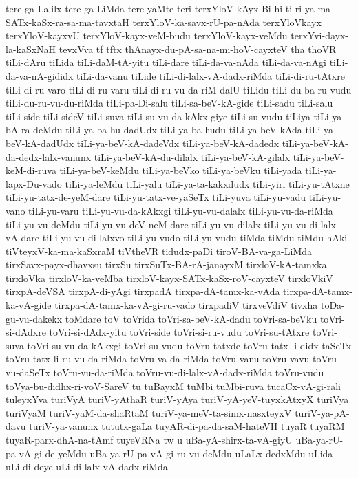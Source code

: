 {tere-ga-Lalilx
tere-ga-LiMda
tere-yaMte
teri
terxYloV-kAyx-Bi-hi-ti-ri-ya-ma-SATx-kaSx-ra-sa-ma-tavxtaH
terxYloV-ka-savx-rU-pa-nAda
terxYloVkayx
terxYloV-kayxvU
terxYloV-kayx-veM-budu
terxYloV-kayx-veMdu
terxYvi-dayx-la-kaSxNaH
tevxVva
tf
tftx
thAnayx-du-pA-sa-na-mi-hoV-cayxteV
tha
thoVR
tiLi-dAru
tiLida
tiLi-daM-tA-yitu
tiLi-dare
tiLi-da-va-nAda
tiLi-da-va-nAgi
tiLi-da-va-nA-gididx
tiLi-da-vanu
tiLide
tiLi-di-lalx-vA-dadx-riMda
tiLi-di-ru-tAtxre
tiLi-di-ru-varo
tiLi-di-ru-varu
tiLi-di-ru-vu-da-riM-dalU
tiLidu
tiLi-du-ba-ru-vudu
tiLi-du-ru-vu-du-riMda
tiLi-pa-Di-salu
tiLi-sa-beV-kA-gide
tiLi-sadu
tiLi-salu
tiLi-side
tiLi-sideV
tiLi-suva
tiLi-su-vu-da-kAkx-giye
tiLi-su-vudu
tiLiya
tiLi-ya-bA-ra-deMdu
tiLi-ya-ba-hu-dadUdx
tiLi-ya-ba-hudu
tiLi-ya-beV-kAda
tiLi-ya-beV-kA-dadUdx
tiLi-ya-beV-kA-dadeVdx
tiLi-ya-beV-kA-dadedx
tiLi-ya-beV-kA-da-dedx-lalx-vanunx
tiLi-ya-beV-kA-du-dilalx
tiLi-ya-beV-kA-gilalx
tiLi-ya-beV-keM-di-ruva
tiLi-ya-beV-keMdu
tiLi-ya-beVko
tiLi-ya-beVku
tiLi-yada
tiLi-ya-lapx-Du-vado
tiLi-ya-leMdu
tiLi-yalu
tiLi-ya-ta-kakxdudx
tiLi-yiri
tiLi-yu-tAtxne
tiLi-yu-tatx-de-yeM-dare
tiLi-yu-tatx-ve-yaSeTx
tiLi-yuva
tiLi-yu-vadu
tiLi-yu-vano
tiLi-yu-varu
tiLi-yu-vu-da-kAkxgi
tiLi-yu-vu-dalalx
tiLi-yu-vu-da-riMda
tiLi-yu-vu-deMdu
tiLi-yu-vu-deV-neM-dare
tiLi-yu-vu-dilalx
tiLi-yu-vu-di-lalx-vA-dare
tiLi-yu-vu-di-lalxvo
tiLi-yu-vudo
tiLi-yu-vudu
tiMda
tiMdu
tiMdu-hAki
tiVteyxV-ka-ma-kaSxraM
tiVtheVR
tidudx-paDi
tiroV-BA-va-ga-LiMda
tirxSavx-payx-dhavxsu
tirxSu
tirxSuTx-BA-rA-janayxM
tirxloV-kA-tamxka
tirxloVka
tirxloV-ka-veMba
tirxloV-kayx-SATx-kaSx-roV-cayxteV
tirxloVkiV
tirxpA-deVSA
tirxpA-di-yAgi
tirxpadA
tirxpa-dA-tamx-ka-vAda
tirxpa-dA-tamx-ka-vA-gide
tirxpa-dA-tamx-ka-vA-gi-ru-vado
tirxpadiV
tirxveVdiV
tivxha
toDa-gu-vu-dakekx
toMdare
toV
toVrida
toVri-sa-beV-kA-dadu
toVri-sa-beVku
toVri-si-dAdxre
toVri-si-dAdx-yitu
toVri-side
toVri-si-ru-vudu
toVri-su-tAtxre
toVri-suva
toVri-su-vu-da-kAkxgi
toVri-su-vudu
toVru-tatxde
toVru-tatx-li-didx-taSeTx
toVru-tatx-li-ru-vu-da-riMda
toVru-va-da-riMda
toVru-vanu
toVru-vavu
toVru-vu-daSeTx
toVru-vu-da-riMda
toVru-vu-di-lalx-vA-dadx-riMda
toVru-vudu
toVya-bu-didhx-ri-voV-SareV
tu
tuBayxM
tuMbi
tuMbi-ruva
tucaCx-vA-gi-rali
tuleyxYva
turiVyA
turiV-yAthaR
turiV-yAya
turiV-yA-yeV-tuyxkAtxyX
turiVya
turiVyaM
turiV-yaM-da-shaRtaM
turiV-ya-meV-ta-simx-nasxteyxV
turiV-ya-pA-davu
turiV-ya-vanunx
tututx-gaLa
tuyAR-di-pa-da-saM-hateVH
tuyaR
tuyaRM
tuyaR-parx-dhA-na-tAmf
tuyeVRNa
tw
u
uBa-yA-shirx-ta-vA-giyU
uBa-ya-rU-pa-vA-gi-de-yeMdu
uBa-ya-rU-pa-vA-gi-ru-vu-deMdu
uLaLx-dedxMdu
uLida
uLi-di-deye
uLi-di-lalx-vA-dadx-riMda
}

